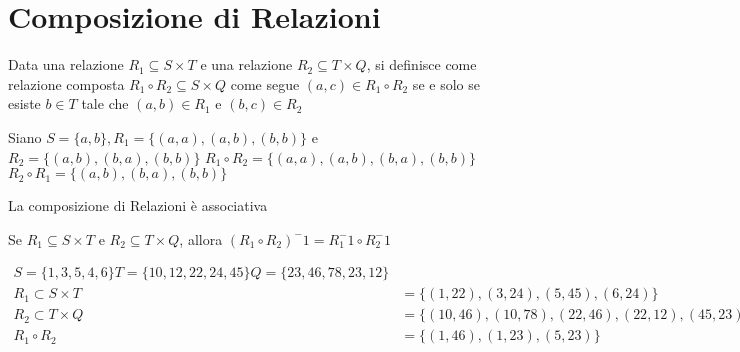 \section{Composizione di Relazioni}
Data una relazione $R_1 \subseteq S \times T$ e una relazione $R_2 \subseteq T \times Q$,
si definisce come relazione composta $R_1 \circ R_2 \subseteq S \times Q$ come segue
$(a,c) \in R_1 \circ R_2$ se e solo se  esiste $b \in T$ tale che $(a,b) \in R_1$ e $(b,c) \in R_2$

Siano $S = \{ a,b \}, R_1 = \{ (a,a),(a,b),(b,b) \}$ e $R_2 = \{ (a,b),(b,a),(b,b) \}$
$R_1 \circ R_2 = \{ (a,a),(a,b),(b,a),(b,b) \}$ \newline
$R_2 \circ R_1 = \{ (a,b),(b,a),(b,b) \}$

\begin{prop}
La composizione di Relazioni è associativa
\end{prop}

\begin{thm}
Se $R_1 \subseteq S \times T$ e $R_2 \subseteq T \times Q$, allora $(R_1 \circ R_2)^-1 = R_1^-1 \circ R_2^-1$
\end{thm}


\begin{equation*}
\begin{split}
S = \{ 1,3,5,4,6\} T = \{10,12,22,24,45\} Q = \{23,46,78,23,12\} \\
R_1 \subset S \times T & = \{(1,22),(3,24),(5,45),(6,24)\} \\
R_2 \subset T \times Q & = \{(10,46),(10,78),(22,46),(22,12),(45,23)\} \\
R_1 \circ R_2 & = \{(1,46),(1,23),(5,23)\} \\
\end{split}
\end{equation*}
